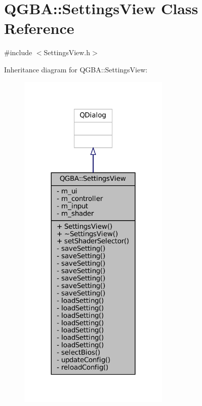 \hypertarget{class_q_g_b_a_1_1_settings_view}{}\section{Q\+G\+BA\+:\+:Settings\+View Class Reference}
\label{class_q_g_b_a_1_1_settings_view}


{\ttfamily \#include $<$Settings\+View.\+h$>$}



Inheritance diagram for Q\+G\+BA\+:\+:Settings\+View\+:
\nopagebreak
\begin{figure}[H]
\begin{center}
\leavevmode
\includegraphics[width=204pt]{class_q_g_b_a_1_1_settings_view__inherit__graph}
\end{center}
\end{figure}


